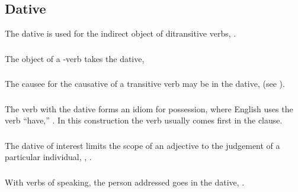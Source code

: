 \subsection{Dative} The dative is used for the indirect object of
ditransitive verbs,  .

\subsubsection{} The object of a -verb takes the dative,   \label{syn:case:dative-si}

\subsubsection{} The causee for the causative of a transitive verb may
be in the dative,   (see ). 

\subsubsection{} The verb  with the dative forms an idiom for
possession, where English uses the verb ``have,'' 
.  In this construction the verb usually comes
first in the clause.  

\subsubsection{} The dative of interest limits the scope of an
adjective to the judgement  of a particular
individual,  ,
 .

\subsubsection{} With verbs of speaking, the person addressed goes in
the dative,  .

